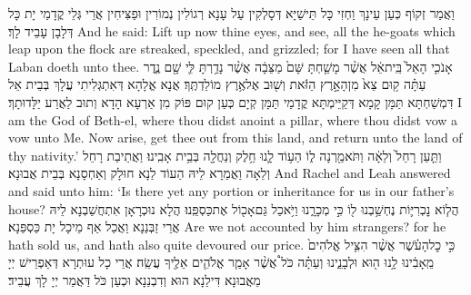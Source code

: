 {וַאֲמַר זְקוֹף כְּעַן עֵינָךְ וַחְזִי כָּל תֵּישַׁיָּא דְּסָלְקִין עַל עָנָא רְגוֹלִין נְמוֹרִין וּפַצִּיחִין אֲרֵי גְּלֵי קֳדָמַי יָת כָּל דְּלָבָן עָבֵיד לָךְ׃}
{And he said: Lift up now thine eyes, and see, all the he-goats which leap upon the flock are streaked, speckled, and grizzled; for I have seen all that Laban doeth unto thee.}{}
{אָנֹכִ֤י הָאֵל֙ בֵּֽית\maqqaf אֵ֔ל אֲשֶׁ֨ר מָשַׁ֤חְתָּ שָּׁם֙ מַצֵּבָ֔ה אֲשֶׁ֨ר נָדַ֥רְתָּ לִּ֛י שָׁ֖ם נֶ֑דֶר עַתָּ֗ה ק֥וּם צֵא֙ מִן\maqqaf הָאָ֣רֶץ הַזֹּ֔את וְשׁ֖וּב אֶל\maqqaf אֶ֥רֶץ מוֹלַדְתֶּֽךָ׃}
{אֲנָא אֱלָהָא דְּאִתְגְּלִיתִי עֲלָךְ בְּבֵית אֵל דִּמְשַׁחְתָּא תַּמָּן קָמָא דְּקַיֵּימְתָּא קֳדָמַי תַּמָּן קְיָם כְּעַן קוּם פּוֹק מִן אַרְעָא הָדָא וְתוּב לַאֲרַע יַלָּדוּתָךְ׃}
{I am the God of Beth-el, where thou didst anoint a pillar, where thou didst vow a vow unto Me. Now arise, get thee out from this land, and return unto the land of thy nativity.’}{}
{וַתַּ֤עַן רָחֵל֙ וְלֵאָ֔ה וַתֹּאמַ֖רְנָה ל֑וֹ הַע֥וֹד לָ֛נוּ חֵ֥לֶק וְנַחֲלָ֖ה בְּבֵ֥ית אָבִֽינוּ׃}
{וַאֲתֵיבַת רָחֵל וְלֵאָה וַאֲמַרָא לֵיהּ הַעוֹד לַנָא חוּלָק וְאַחְסָנָא בְּבֵית אֲבוּנָא׃}
{And Rachel and Leah answered and said unto him: ‘Is there yet any portion or inheritance for us in our father’s house?}{}
{הֲל֧וֹא נׇכְרִיּ֛וֹת נֶחְשַׁ֥בְנוּ ל֖וֹ כִּ֣י מְכָרָ֑נוּ וַיֹּ֥אכַל גַּם\maqqaf אָכ֖וֹל אֶת\maqqaf כַּסְפֵּֽנוּ׃}
{הֲלָא נוּכְרָאָן אִתְחֲשַׁבְנָא לֵיהּ אֲרֵי זַבְּנַנָא וַאֲכַל אַף מֵיכָל יָת כַּסְפַּנָא׃}
{Are we not accounted by him strangers? for he hath sold us, and hath also quite devoured our price.}{}
{כִּ֣י כׇל\maqqaf הָעֹ֗שֶׁר אֲשֶׁ֨ר הִצִּ֤יל אֱלֹהִים֙ מֵֽאָבִ֔ינוּ לָ֥נוּ ה֖וּא וּלְבָנֵ֑ינוּ וְעַתָּ֗ה כֹּל֩ אֲשֶׁ֨ר אָמַ֧ר אֱלֹהִ֛ים אֵלֶ֖יךָ עֲשֵֽׂה׃}
{אֲרֵי כָל עוּתְרָא דְּאַפְרֵישׁ יְיָ מֵאֲבוּנָא דִּילַנָא הוּא וְדִבְנַנָא וּכְעַן כֹּל דַּאֲמַר יְיָ לָךְ עֲבֵיד׃}

